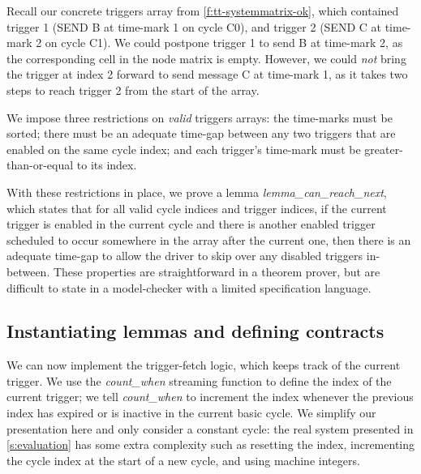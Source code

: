Recall our concrete triggers array from \autoref{f:tt-systemmatrix-ok}, which contained trigger 1 (SEND B at time-mark 1 on cycle C0), and trigger 2 (SEND C at time-mark 2 on cycle C1).
We could postpone trigger 1 to send B at time-mark 2, as the corresponding cell in the node matrix is empty.
However, we could \emph{not} bring the trigger at index 2 forward to send message C at time-mark 1, as it takes two steps to reach trigger 2 from the start of the array.

We impose three restrictions on \emph{valid} triggers arrays: the time-marks must be sorted; there must be an adequate time-gap between any two triggers that are enabled on the same cycle index; and each trigger's time-mark must be greater-than-or-equal to its index.

With these restrictions in place, we prove a lemma \emph{lemma_can_reach_next}, which states that for all valid cycle indices and trigger indices, if the current trigger is enabled in the current cycle and there is another enabled trigger scheduled to occur somewhere in the array after the current one, then there is an adequate time-gap to allow the driver to skip over any disabled triggers in-between.
These properties are straightforward in a theorem prover, but are difficult to state in a model-checker with a limited specification language.

\subsection{Instantiating lemmas and defining contracts}
\label{s:motivation:contract}

We can now implement the trigger-fetch logic, which keeps track of the current trigger.
We use the \emph{count_when} streaming function to define the index of the current trigger; we tell \emph{count_when} to increment the index whenever the previous index has expired or is inactive in the current basic cycle.
We simplify our presentation here and only consider a constant cycle: the real system presented in \autoref{s:evaluation} has some extra complexity such as resetting the index, incrementing the cycle index at the start of a new cycle, and using machine integers.

